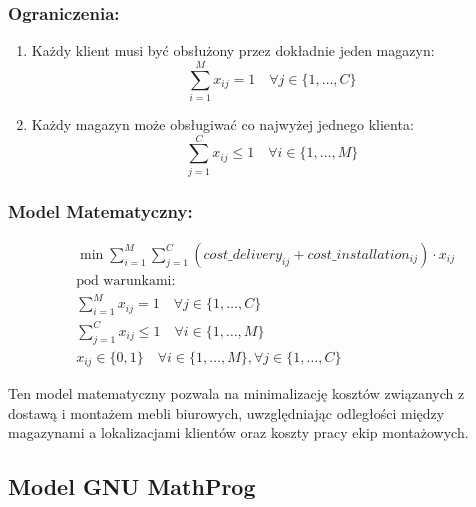 \subsubsection*{Ograniczenia:}

\begin{enumerate}
    \item Każdy klient musi być obsłużony przez dokładnie jeden magazyn:
          \[
              \sum_{i=1}^{M} x_{ij} = 1 \quad \forall j \in \{1, \ldots, C\}
          \]

    \item Każdy magazyn może obsługiwać co najwyżej jednego klienta:
          \[
              \sum_{j=1}^{C} x_{ij} \leq 1 \quad \forall i \in \{1, \ldots, M\}
          \]
\end{enumerate}

\subsubsection*{Model Matematyczny:}

\[
    \begin{aligned}
         & \min \sum_{i=1}^{M} \sum_{j=1}^{C} (cost\_delivery_{ij} + cost\_installation_{ij}) \cdot x_{ij} \\
         & \text{pod warunkami:}                                                                           \\
         & \sum_{i=1}^{M} x_{ij} = 1 \quad \forall j \in \{1, \ldots, C\}                                  \\
         & \sum_{j=1}^{C} x_{ij} \leq 1 \quad \forall i \in \{1, \ldots, M\}                               \\
         & x_{ij} \in \{0, 1\} \quad \forall i \in \{1, \ldots, M\}, \forall j \in \{1, \ldots, C\}
    \end{aligned}
\]

Ten model matematyczny pozwala na minimalizację kosztów związanych z dostawą i montażem mebli biurowych, uwzględniając odległości między magazynami a lokalizacjami klientów oraz koszty pracy ekip montażowych.
\subsection{Model GNU MathProg}

